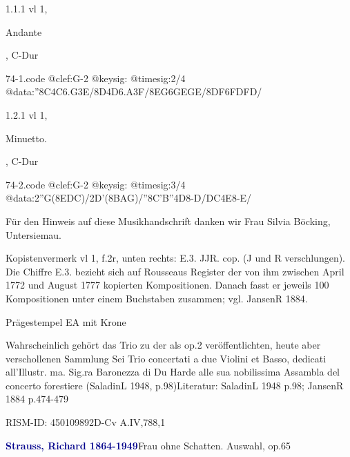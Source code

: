 \documentclass[a4paper, twocolumn, 11pt]{book}
\begin{document}
\par 1.1.1  vl 1, \begin{itshape}Andante\end{itshape}, C-Dur  
\begin{filecontents*}{74-1.code}
@clef:G-2
@keysig:
@timesig:2/4
@data:''8C4C{6.G3E}/8D4D{6.A3F}/{8EG}{6GEGE}/{8DF}{6FDFD}/
\end{filecontents*}
\newline %
\par 1.2.1  vl 1, \begin{itshape}Minuetto.\end{itshape}, C-Dur  
\begin{filecontents*}{74-2.code}
@clef:G-2
@keysig:
@timesig:3/4
@data:2''G(8{EDC})/2D'({8BAG})/''{8C'B}''4D8-D/{DC}4E8-E/
\end{filecontents*}
\newline %
\par Für den Hinweis auf diese Musikhandschrift danken wir Frau Silvia Böcking, Untersiemau.
\par Kopistenvermerk vl 1, f.2r, unten rechts: {\textquotedbl}E.3. JJR. cop.{\textquotedbl} ({\textquotedbl}J{\textquotedbl} und {\textquotedbl}R{\textquotedbl} verschlungen). Die Chiffre {\textquotedbl}E.3.{\textquotedbl} bezieht sich auf Rousseaus Register der von ihm zwischen April 1772 und August 1777 kopierten Kompositionen. Danach fasst er jeweils 100 Kompositionen unter einem Buchstaben zusammen; vgl. JansenR 1884.
\par Prägestempel EA mit Krone
\par Wahrscheinlich gehört das Trio zu der als op.2 veröffentlichten, heute aber verschollenen Sammlung {\textquotedbl}Sei Trio concertati a due Violini et Basso, dedicati all'Illustr. ma. Sig.ra Baronezza di Du Harde alle sua nobilissima Assambla del concerto forestiere{\textquotedbl} (SaladinL 1948, p.98)\newline Literatur: SaladinL 1948  p.98; JansenR 1884  p.474-479
\par RISM-ID: 450109892\newline D-Cv  A.IV,788,1
\par \vspace{16pt} \textcolor{darkblue}{\textbf{Strauss, Richard  1864-1949}}\hfillplus{[75]}\newline Frau ohne Schatten. Auswahl, op.65
\end{document}
